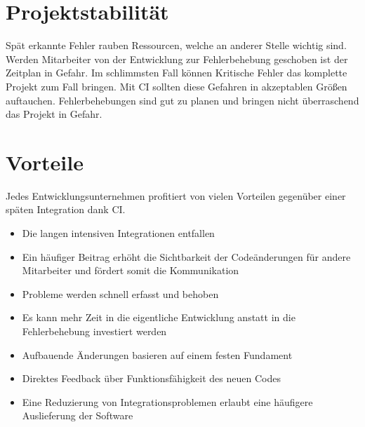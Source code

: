 \section{Projektstabilität}
Spät erkannte Fehler rauben Ressourcen, welche an anderer Stelle wichtig sind. Werden Mitarbeiter von der Entwicklung zur Fehlerbehebung geschoben ist der Zeitplan in Gefahr. Im schlimmsten Fall können Kritische Fehler das komplette Projekt zum Fall bringen. Mit CI sollten diese Gefahren in akzeptablen Größen auftauchen. Fehlerbehebungen sind gut zu planen und bringen nicht überraschend das Projekt in Gefahr. 

\section{Vorteile}
Jedes Entwicklungsunternehmen profitiert von vielen Vorteilen gegenüber einer späten Integration dank CI.
\begin{itemize}
	\item Die langen intensiven Integrationen entfallen
	\item Ein häufiger Beitrag erhöht die Sichtbarkeit der Codeänderungen für andere Mitarbeiter und fördert somit die Kommunikation
	\item  Probleme werden schnell erfasst und behoben
	\item Es kann mehr Zeit in die eigentliche Entwicklung anstatt in die Fehlerbehebung investiert werden
	\item Aufbauende Änderungen basieren auf einem festen Fundament
	\item Direktes Feedback über Funktionsfähigkeit des neuen Codes
	\item Eine Reduzierung von Integrationsproblemen erlaubt eine häufigere Auslieferung der Software
\end{itemize}
